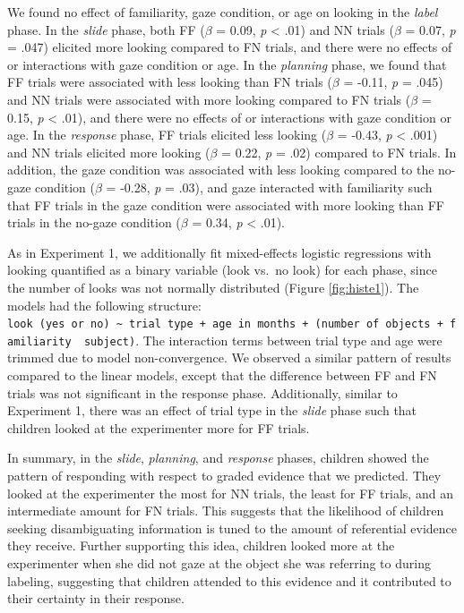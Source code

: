 \documentclass[english,man]{apa6}
\theoremstyle{definition}
\theoremstyle{definition}
\theoremstyle{definition}
\theoremstyle{remark}
\begin{document}
We found no effect of familiarity, gaze condition, or age on looking in
the \emph{label} phase. In the \emph{slide} phase, both FF (\(\beta\) =
0.09, \emph{p} \textless{} .01) and NN trials (\(\beta\) = 0.07,
\emph{p} = .047) elicited more looking compared to FN trials, and there
were no effects of or interactions with gaze condition or age. In the
\emph{planning} phase, we found that FF trials were associated with less
looking than FN trials (\(\beta\) = -0.11, \emph{p} = .045) and NN
trials were associated with more looking compared to FN trials
(\(\beta\) = 0.15, \emph{p} \textless{} .01), and there were no effects
of or interactions with gaze condition or age. In the \emph{response}
phase, FF trials elicited less looking (\(\beta\) = -0.43, \emph{p}
\textless{} .001) and NN trials elicited more looking (\(\beta\) = 0.22,
\emph{p} = .02) compared to FN trials. In addition, the gaze condition
was associated with less looking compared to the no-gaze condition
(\(\beta\) = -0.28, \emph{p} = .03), and gaze interacted with
familiarity such that FF trials in the gaze condition were associated
with more looking than FF trials in the no-gaze condition (\(\beta\) =
0.34, \emph{p} \textless{} .01).

As in Experiment 1, we additionally fit mixed-effects logistic
regressions with looking quantified as a binary variable (look vs.~no
look) for each phase, since the number of looks was not normally
distributed (Figure \ref{fig:histe1}). The models had the following
structure:
\texttt{look\ (yes\ or\ no)\ \textasciitilde{}\ trial\ type\ +\ age\ in\ months\ +\ (number\ of\ objects\ +\ familiarity\ \textbar{}\ subject)}.
The interaction terms between trial type and age were trimmed due to
model non-convergence. We observed a similar pattern of results compared
to the linear models, except that the difference between FF and FN
trials was not significant in the response phase. Additionally, similar
to Experiment 1, there was an effect of trial type in the \emph{slide}
phase such that children looked at the experimenter more for FF trials.

In summary, in the \emph{slide}, \emph{planning}, and \emph{response}
phases, children showed the pattern of responding with respect to graded
evidence that we predicted. They looked at the experimenter the most for
NN trials, the least for FF trials, and an intermediate amount for FN
trials. This suggests that the likelihood of children seeking
disambiguating information is tuned to the amount of referential
evidence they receive. Further supporting this idea, children looked
more at the experimenter when she did not gaze at the object she was
referring to during labeling, suggesting that children attended to this
evidence and it contributed to their certainty in their response.
\end{document}
